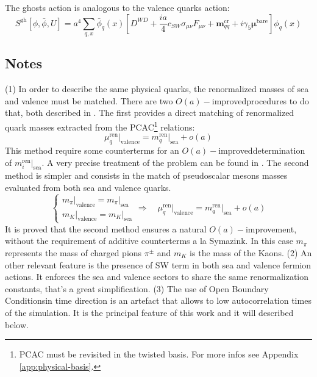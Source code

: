 \documentclass[english, LaM, oneside, noexaminfo]{sapthesis}
\newcommand{\bare}{^{\text{bare}}}
\newcommand{\ren}{{\text{ren}}}
\newcommand{\oaid}{$O(a)-$improved}
\newcommand{\oait}{$O(a)-$improvement}
\newcommand{\obc}{Open Boundary Conditions}
\begin{document}
The ghosts action is analogous to the valence quarks action:
\begin{equation}\label{eq:ghost-action}
    S^{\text{gh}}[\phi, \bar\phi, U] = a^4 \sum_{q,x} \bar \phi_q (x) \left[ D^{WD} + \frac{ia}{4}c_{SW}\sigma_{\mu\nu}\hat F_{\mu\nu} + \boldsymbol{m}^\text{cr}_{qq} + i\gamma_5\boldsymbol{\mu}\bare \right] \phi_q (x)
\end{equation}


\subsection*{Notes}
\noindent
(1) In order to describe the same physical quarks, the renormalized masses of sea and valence must be matched.
There are two \oaid\space procedures to do that, both described in \cite{matching-masses}.
The first provides a direct matching of renormalized quark masses extracted from the PCAC\footnote{PCAC must be revisited in the twisted basis. For more infos see Appendix \ref{app:physical-basis}.} relations:
\begin{equation*}
    \mu_q^\ren \big|_\text{valence} = m_q^\ren \big|_\text{sea} + o(a)
\end{equation*}
This method require some counterterms for an \oaid\space determination of $m_i^\ren \big|_\text{sea}$.
A very precise treatment of the problem can be found in \cite{bussone2019matching}.
The second method is simpler and consists in the match of pseudoscalar mesons masses evaluated from both sea and valence quarks.
\begin{equation*}
    \begin{cases}
        m_\pi \big|_\text{valence} = m_\pi \big|_\text{sea} \\
        m_K \big|_\text{valence} = m_K \big|_\text{sea}
    \end{cases}
    \Longrightarrow \quad  \mu_q^\ren \big|_\text{valence} = m_q^\ren \big|_\text{sea} + o(a)
\end{equation*}
It is proved that the second method ensures a natural \oait, without the requirement of additive counterterms a la Symazink.
In this case $m_\pi$ represents the mass of charged pions $\pi^\pm$ and $m_K$ is the mass of the Kaons.
\newline
\newline
(2) An other relevant feature is the presence of SW term in both sea and valence fermion actions. 
It enforces the sea and valence sectors to share the same renormalization constants, that's a great simplification. 
\newline
\newline
(3) The use of \obc\space in time direction is an artefact that allows to low autocorrelation times of the simulation.
It is the principal feature of this work and it will described below.
\end{document}
